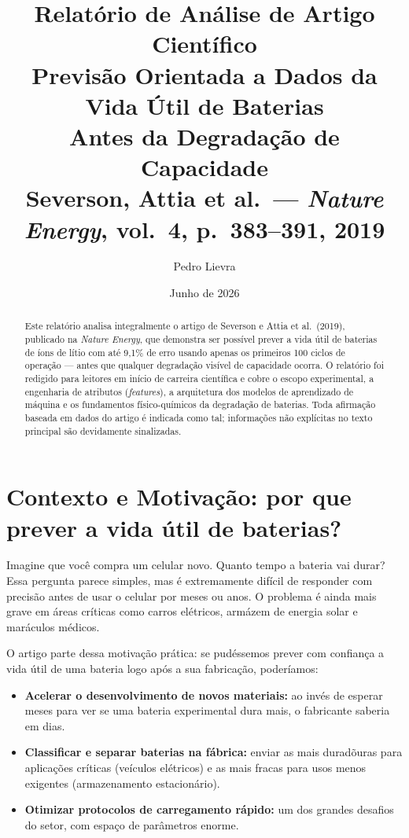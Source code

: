\documentclass[12pt,a4paper]{article}
\title{
  \vspace{-1cm}
  {\large Relat\'{o}rio de An\'{a}lise de Artigo Cient\'{i}fico} \\[0.5em]
  \textbf{\large Previs\~ao Orientada a Dados da Vida \'{U}til de Baterias\\
  Antes da Degrada\c{c}\~ao de Capacidade} \\[0.4em]
  {\normalsize Severson, Attia et al.\ --- \emph{Nature Energy}, vol.\ 4, p.\ 383--391, 2019}
}
\author{Pedro Lievra}
\date{Junho de 2026}
\begin{document}
\maketitle
\thispagestyle{fancy}

\begin{abstract}
Este relat\'{o}rio analisa integralmente o artigo de Severson e Attia et al.\ (2019),
publicado na \emph{Nature Energy}, que demonstra ser poss\'{i}vel prever a vida \'{u}til
de baterias de \'{i}ons de l\'{i}tio com at\'{e} 9,1\% de erro usando apenas os primeiros
100 ciclos de opera\c{c}\~ao --- antes que qualquer degrada\c{c}\~ao vis\'{i}vel de capacidade
ocorra. O relat\'{o}rio foi redigido para leitores em in\'{i}cio de carreira cient\'{i}fica
e cobre o escopo experimental, a engenharia de atributos (\textit{features}),
a arquitetura dos modelos de aprendizado de m\'{a}quina e os fundamentos
f\'{i}sico-qu\'{i}micos da degrada\c{c}\~ao de baterias. Toda afirma\c{c}\~ao baseada em dados
do artigo \'{e} indicada como tal; informa\c{c}\~oes n\~ao expl\'{i}citas no texto principal
s\~ao devidamente sinalizadas.
\end{abstract}

\tableofcontents
\newpage

\section{Contexto e Motiva\c{c}\~ao: por que prever a vida \'{u}til de baterias?}

Imagine que voc\^{e} compra um celular novo. Quanto tempo a bateria vai durar?
Essa pergunta parece simples, mas \'{e} extremamente dif\'{i}cil de responder com precis\~ao
antes de usar o celular por meses ou anos. O problema \'{e} ainda mais grave em
\'{a}reas cr\'{i}ticas como carros el\'{e}tricos, arm\'azem de energia solar e mar\'aculos
m\'{e}dicos.

O artigo parte dessa motiva\c{c}\~ao pr\'{a}tica: se pud\'{e}ssemos prever com confian\c{c}a
a vida \'{u}til de uma bateria logo ap\'{o}s a sua fabrica\c{c}\~ao, poder\'{i}amos:

\begin{itemize}
  \item \textbf{Acelerar o desenvolvimento de novos materiais:} ao inv\'{e}s de
    esperar meses para ver se uma bateria experimental dura mais, o fabricante
    saberia em dias.
  \item \textbf{Classificar e separar baterias na f\'{a}brica:} enviar as mais durad\~ouras
    para aplica\c{c}\~oes cr\'{i}ticas (ve\'{i}culos el\'{e}tricos) e as mais fracas para usos
    menos exigentes (armazenamento estacion\'{a}rio).
  \item \textbf{Otimizar protocolos de carregamento r\'{a}pido:} um dos grandes desafios
    do setor, com espa\c{c}o de par\^{a}metros enorme.
\end{itemize}
\end{document}
